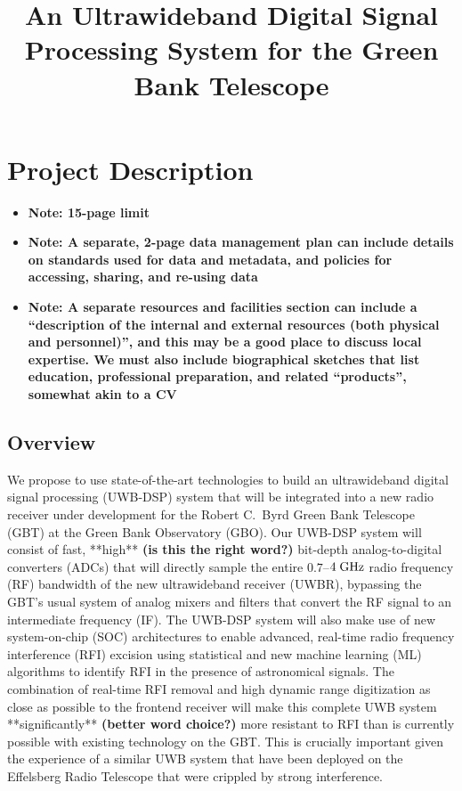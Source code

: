 \documentclass[10pt]{NSF}
\begin{document}
\title{An Ultrawideband Digital Signal Processing System for the Green
  Bank Telescope}
\maketitle

\section{Project Description}
\label{sec:project_description}

\begin{itemize}
\item{\textbf{Note: 15-page limit}}
\item{\textbf{Note: A separate, 2-page data management plan can
      include details on standards used for data and metadata, and
      policies for accessing, sharing, and re-using data}}
\item{\textbf{Note: A separate resources and facilities section can
      include a ``description of the internal and external resources
      (both physical and personnel)'', and this may be a good place to
      discuss local expertise.  We must also include biographical
      sketches that list education, professional preparation, and
      related ``products'', somewhat akin to a CV}}
\end{itemize}

\subsection{Overview}
\label{sec:overview}

We propose to use state-of-the-art technologies to build an
ultrawideband digital signal processing (UWB-DSP) system that will be
integrated into a new radio receiver under development for the Robert
C.\ Byrd Green Bank Telescope (GBT) at the Green Bank Observatory
(GBO).  Our UWB-DSP system will consist of fast, **high** \textbf{(is
  this the right word?)} bit-depth analog-to-digital converters (ADCs)
that will directly sample the entire $0.7$--$4\; \textrm{GHz}$ radio frequency
(RF) bandwidth of the new ultrawideband receiver (UWBR), bypassing the
GBT's usual system of analog mixers and filters that convert the RF
signal to an intermediate frequency (IF).  The UWB-DSP system will
also make use of new system-on-chip (SOC) architectures to enable
advanced, real-time radio frequency interference (RFI) excision using
statistical and new machine learning (ML) algorithms to identify RFI
in the presence of astronomical signals.  The combination of real-time
RFI removal and high dynamic range digitization as close as possible
to the frontend receiver will make this complete UWB system
**significantly** \textbf{(better word choice?)} more resistant to RFI
than is currently possible with existing technology on the GBT.  This
is crucially important given the experience of a similar UWB system
that have been deployed on the Effelsberg Radio Telescope that were
crippled by strong interference.
\end{document}
